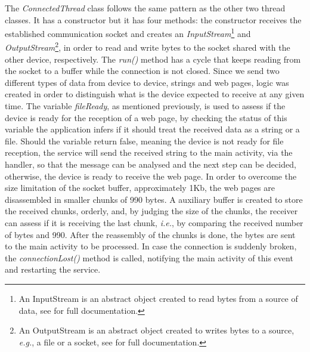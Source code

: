 The \textit{ConnectedThread} class follows the same pattern as the other two thread classes. It has a constructor but it has four methods: the constructor receives the established communication socket and creates an \textit{InputStream}\footnote{An InputStream is an abstract object created to read bytes from a source of data, see \cite{inputStream} for full documentation.} and \textit{OutputStream}\footnote{An OutputStream is an abstract object created to writes bytes to a source, \textit{e.g.}, a file or a socket, see \cite{outputStream} for full documentation.}, in order to read and write bytes to the socket shared with the other device, respectively. The \textit{run()} method has a cycle that keeps reading from the socket to a buffer while the connection is not closed. Since we send two different types of data from device to device, strings and web pages, logic was created in order to distinguish what is the device expected to receive at any given time. The variable \textit{fileReady}, as mentioned previously, is used to assess if the device is ready for the reception of a web page, by checking the status of this variable the application infers if it should treat the received data as a string or a file. Should the variable return false, meaning the device is not ready for file reception, the service will send the received string to the main activity, via the handler, so that the message can be analysed and the next step can be decided, otherwise, the device is ready to receive the web page. In order to overcome the size limitation of the socket buffer, approximately 1Kb, the web pages are disassembled in smaller chunks of 990 bytes. A auxiliary buffer is created to store the received chunks, orderly, and, by judging the size of the chunks, the receiver can assess if it is receiving the last chunk, \textit{i.e.}, by comparing the received number of bytes and 990. After the reassembly of the chunks is done, the bytes are sent to the main activity to be processed. In case the connection is suddenly broken, the \textit{connectionLost()} method is called, notifying the main activity of this event and restarting the service.


